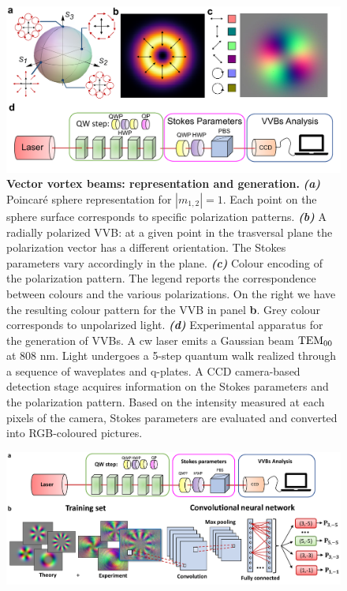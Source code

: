 \begin{figure}[t]
	\centering
    \includegraphics[width=\textwidth]{Figures/quantum-walks/VVBs-VVBschemaQW.pdf}
    \caption{
    	\textbf{Vector vortex beams: representation and generation.}
		\textbf{\emph{(a)}}
		Poincar\'e sphere representation for $|m_{1,2}|=1$. Each point on the sphere surface corresponds to specific polarization patterns. 
		\textbf{\emph{(b)}}
		A radially polarized \ac{VVB}: at a given point in the trasversal plane the polarization vector has a different orientation. The Stokes parameters vary accordingly in the plane.
		\textbf{\emph{(c)}}
		Colour encoding of the polarization pattern. 
		The legend reports the correspondence between colours and the various polarizations.
		On the right we have the resulting colour pattern for the VVB in panel {\bf b}. Grey colour 
		corresponds to unpolarized light.
		\textbf{\emph{(d)}}
		Experimental apparatus for the generation of \acp{VVB}. A cw laser emits a Gaussian beam $\operatorname{TEM}_{00}$ at $808$ nm. Light undergoes a 5-step quantum walk realized through a sequence of waveplates and q-plates. 
		A CCD camera-based detection stage acquires information on the Stokes parameters and the polarization pattern. Based on the intensity measured at each pixels of the  camera, Stokes parameters are evaluated and converted into RGB-coloured pictures.
	}
\label{fig:qw_poinc_sphere}
\end{figure}

\begin{figure}
	\centering
	\includegraphics[width=\textwidth]{Figures/quantum-walks/VVBs-schema.pdf}
\end{figure}

